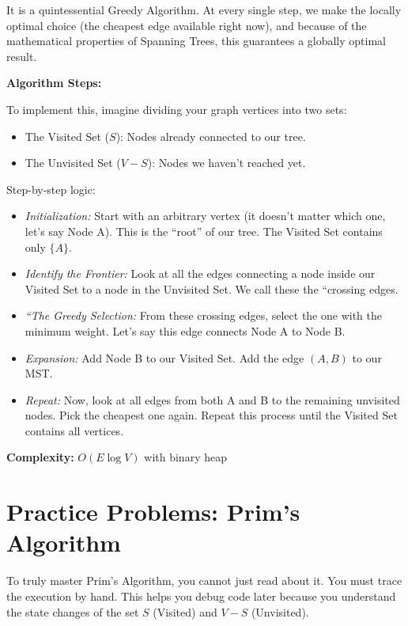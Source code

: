 \documentclass[
  letterpaper,
  DIV=11,
  numbers=noendperiod]{scrreprt}
\providecommand{\tightlist}{%
  \setlength{\itemsep}{0pt}\setlength{\parskip}{0pt}}
\begin{document}
It is a quintessential Greedy Algorithm. At every single step, we make
the locally optimal choice (the cheapest edge available right now), and
because of the mathematical properties of Spanning Trees, this
guarantees a globally optimal result.

\textbf{Algorithm Steps:}

To implement this, imagine dividing your graph vertices into two sets:

\begin{itemize}
\tightlist
\item
  The Visited Set (\(S\)): Nodes already connected to our tree.
\item
  The Unvisited Set (\(V-S\)): Nodes we haven't reached yet.
\end{itemize}

Step-by-step logic:

\begin{itemize}
\tightlist
\item
  \emph{Initialization:} Start with an arbitrary vertex (it doesn't
  matter which one, let's say Node A). This is the ``root'' of our tree.
  The Visited Set contains only \(\{A\}\).
\item
  \emph{Identify the Frontier:} Look at all the edges connecting a node
  inside our Visited Set to a node in the Unvisited Set. We call these
  the ``crossing edges.
\item
  \emph{``The Greedy Selection:} From these crossing edges, select the
  one with the minimum weight. Let's say this edge connects Node A to
  Node B.
\item
  \emph{Expansion:} Add Node B to our Visited Set. Add the edge
  \((A, B)\) to our MST.
\item
  \emph{Repeat:} Now, look at all edges from both A and B to the
  remaining unvisited nodes. Pick the cheapest one again. Repeat this
  process until the Visited Set contains all vertices.
\end{itemize}

\textbf{Complexity:} \(O(E \log V)\) with binary heap

\section{Practice Problems: Prim's
Algorithm}\label{practice-problems-prims-algorithm}

To truly master Prim's Algorithm, you cannot just read about it. You
must trace the execution by hand. This helps you debug code later
because you understand the state changes of the set \(S\) (Visited) and
\(V-S\) (Unvisited).
\end{document}
